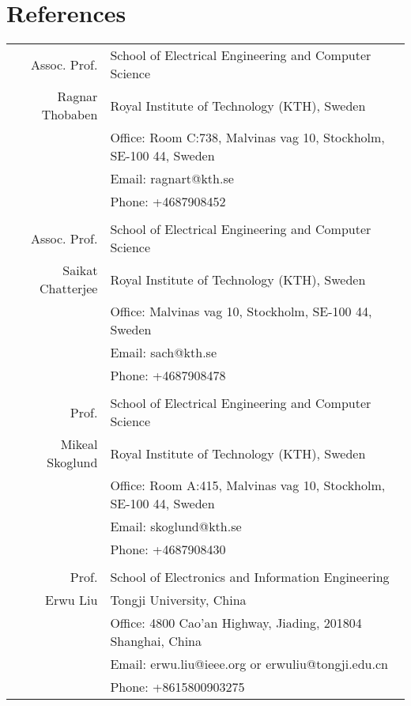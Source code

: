 \documentclass[a4paper,10pt]{article}
\begin{document}
\section{References}
\begin{longtable}[H]{r|p{13.5cm}}
  Assoc. Prof. & School of Electrical Engineering and Computer Science\\
  Ragnar Thobaben &Royal Institute of Technology (KTH), Sweden \\
               & Office: Room C:738, Malvinas vag 10, Stockholm, SE-100 44, Sweden \\
               & Email: ragnart@kth.se \\
               & Phone: +4687908452 \\

  \multicolumn{2}{c}{} \\
  Assoc. Prof. & School of Electrical Engineering and Computer Science\\
  Saikat Chatterjee &Royal Institute of Technology (KTH), Sweden \\
               & Office: Malvinas vag 10, Stockholm, SE-100 44, Sweden \\
               & Email: sach@kth.se \\
               & Phone: +4687908478 \\

  \multicolumn{2}{c}{} \\

  Prof.  & School of Electrical Engineering and Computer Science \\
  Mikeal Skoglund &Royal Institute of Technology (KTH), Sweden \\
               & Office: Room A:415, Malvinas vag 10, Stockholm, SE-100 44, Sweden \\
               & Email: skoglund@kth.se \\
               & Phone: +4687908430 \\

  \multicolumn{2}{c}{} \\
  Prof. & School of Electronics and Information Engineering \\
  Erwu Liu &Tongji University, China \\
               & Office: 4800 Cao'an Highway, Jiading, 201804 Shanghai, China\\
               & Email: erwu.liu@ieee.org or erwuliu@tongji.edu.cn \\
               & Phone: +8615800903275
\end{longtable}
\end{document}
